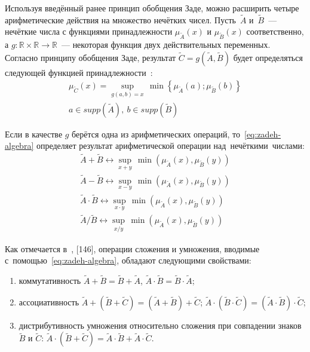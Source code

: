 Используя введённый ранее принцип обобщения Заде, можно расширить четыре арифметические действия на множество нечётких чисел. Пусть~$\tilde{A}$ и~$\tilde{B}$~--- нечёткие числа с функциями принадлежности $\mu_{\tilde A}\left( x \right)$ и $\mu_{\tilde B}\left( x \right)$ соответственно, а $g:\mathbb{R}\times \mathbb{R}\to \mathbb{R}$~--- некоторая функция двух действительных переменных. Согласно принципу обобщения Заде, результат $\tilde{C}=g\left( \tilde{A},\tilde{B} \right)$ будет определяться следующей функцией принадлежности~\cite{Borisov_Alexeev_Msk, Pospelov, Rutkovskaya, Yakhyaeva}:
\begin{equation}
\label{eq:zadeh-algebra}
	\begin{matrix}
		\mu_{\tilde C}\left( x \right)=\underset{g\left( a,b \right)=x}{\mathop{\sup }}{}\,\min \left\{ {{\mu }_{{\tilde{A}}}}\left( a \right);{{\mu }_{{\tilde{B}}}}\left( b \right) \right\} \\ 
		  a\in supp\left( {\tilde{A}} \right),\ b\in supp\left( {\tilde{B}} \right) 
	\end{matrix}
\end{equation}

Если в качестве $g$ берётся одна из арифметических операций, то~\eqref{eq:zadeh-algebra} определяет результат арифметической операции над~нечёткими~числами:
\begin{gather*}
		\tilde{A}+\tilde{B} \leftrightarrow \underset{x+y}{\mathop{\sup }}\,\min \left( {{\mu }_{{\tilde{A}}}}\left( x \right),{{\mu }_{{\tilde{B}}}}\left( y \right) \right) \\
		\tilde{A}-\tilde{B} \leftrightarrow \underset{x-y}{\mathop{\sup }}\,\min \left( {{\mu }_{{\tilde{A}}}}\left( x \right),{{\mu }_{{\tilde{B}}}}\left( y \right) \right) \\
		\tilde{A}\cdot \tilde{B} \leftrightarrow \underset{x\cdot y}{\mathop{\sup }}\,\min \left( {{\mu }_{{\tilde{A}}}}\left( x \right),{{\mu }_{{\tilde{B}}}}\left( y \right) \right) \\
		\tilde{A}/\tilde{B} \leftrightarrow \underset{x/y}{\mathop{\sup }}\,\min \left( \mu_{\tilde A}\left( x \right), \mu_{\tilde B} \left( y \right) \right) 
\end{gather*}

Как отмечается в~\cite{Pospelov, Borisov_Alexeev_Msk, Yakhyaeva}, [146], операции сложения и умножения, вводимые с~помощью~\eqref{eq:zadeh-algebra}, обладают следующими свойствами:
\begin{enumerate}
	\item коммутативность $\tilde{A}+\tilde{B}=\tilde{B}+\tilde{A}$, $\tilde{A}\cdot \tilde{B}=\tilde{B}\cdot \tilde{A}$;
	\item ассоциативность $\tilde{A}+\left( \tilde{B}+\tilde{C} \right)=\left( \tilde{A}+\tilde{B} \right)+\tilde{C}$; $\tilde{A}\cdot \left( \tilde{B}\cdot \tilde{C} \right)=\left( \tilde{A}\cdot \tilde{B} \right)\cdot \tilde{C}$;
	\item дистрибутивность умножения относительно сложения при совпадении знаков $\tilde{B}$ и $\tilde{C}$: $\tilde{A}\cdot \left( \tilde{B}+\tilde{C} \right)=\tilde{A}\cdot \tilde{B}+\tilde{A}\cdot \tilde{C}$.
\end{enumerate}

